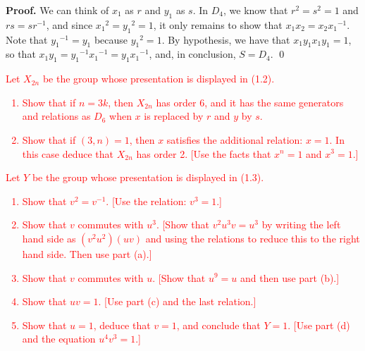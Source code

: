 \begin{enumerate}
      \textbf{Proof.} We can think of $x_1$ as $r$ and $y_1$ as $s$. In $D_4$,
      we know that $r^2 = s^2 = 1$ and $rs = sr^{-1}$, and since
      ${x_1}^2 = {y_1}^2 = 1$, it only remains to show that
      $x_1x_2 = x_2{x_1}^{-1}$. Note that ${y_1}^{-1} = y_1$ because
      ${y_1}^2 = 1$. By hypothesis, we have that $x_1y_1x_1y_1 = 1$,
      so that $x_1y_1 = {y_1}^{-1}{x_1}^{-1} = y_1{x_1}^{-1}$, and, in 
      conclusion, $S = D_4$. \qed
   \textcolor{red}{\item[1.2.17]  Let $X_{2n}$ be the group whose presentation is displayed in
                  (1.2).
                  \begin{enumerate}
                     \item Show that if $n = 3k$, then $X_{2n}$ has order 6, and
                           it has the same generators and relations as $D_6$
                           when $x$ is replaced by $r$ and $y$ by $s$.
                     \item Show that if $(3, n) = 1$, then $x$ satisfies the
                           additional relation: $x = 1$. In this case deduce
                           that $X_{2n}$ has order 2. [Use the facts that
                           $x^n = 1$ and $x^3 = 1$.]
                  \end{enumerate}
   \item[1.2.18]  Let $Y$ be the group whose presentation is displayed in (1.3).
                  \begin{enumerate}
                     \item Show that $v^2 = v^{-1}$.
                           [Use the relation: $v^3 = 1$.]
                     \item Show that $v$ commutes with $u^3$. [Show that
                           $v^2u^3v = u^3$ by writing the left hand side as
                           $(v^2u^2)(uv)$ and using the relations to reduce this
                           to the right hand side. Then use part (a).]
                     \item Show that $v$ commutes with $u$. [Show that $u^9 = u$
                           and then use part (b).]
                     \item Show that $uv = 1$. [Use part (c) and the last
                           relation.]
                     \item Show that $u = 1$, deduce that $v = 1$, and conclude
                           that $Y = 1$. [Use part (d) and the equation
                           $u^4v^3 = 1$.]
                  \end{enumerate}}
\end{enumerate}
